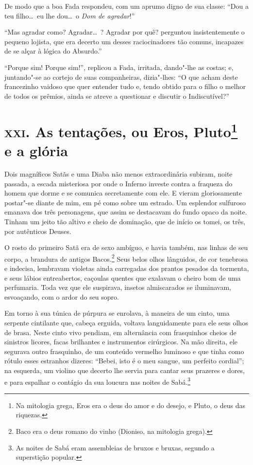 De modo que a boa Fada respondeu, com um aprumo digno de sua classe:
``Dou a teu filho\ldots\  eu lhe dou\ldots\  o \textit{Dom de
agradar}!''

``Mas agradar como? Agradar\ldots\ ? Agradar por quê? perguntou insistentemente 
o pequeno lojista, que era decerto um desses
raciocinadores tão comuns, incapazes de se alçar à lógica do
Absurdo.''

``Porque sim! Porque sim!'', replicou a Fada,
irritada, dando"-lhe as costas; e, juntando"-se ao cortejo de suas
companheiras, dizia"-lhes: ``O que acham deste
francezinho vaidoso que quer entender tudo e, tendo obtido para o filho o 
melhor de todos os prêmios, ainda se atreve a questionar e discutir o
Indiscutível?''

\chapter{\textsc{xxi.} As tentações, ou Eros, Pluto\footnote[*]{Na mitologia  grega, Eros era o deus do amor e do desejo, e Pluto, o deus das riquezas.} e a glória}

Dois magníficos Satãs e uma Diaba não menos extraordinária subiram,
noite passada, a escada misteriosa por onde o Inferno investe contra a
fraqueza do homem que dorme e se comunica secretamente com ele. E 
vieram gloriosamente postar"-se diante de mim, em pé como sobre um
estrado. Um esplendor sulfuroso emanava dos três personagens, que
assim se destacavam do fundo opaco da noite. Tinham um jeito tão altivo
e cheio de dominação, que de início os tomei, os três, por autênticos Deuses.

O rosto do primeiro Satã era de sexo ambíguo, e havia também, nas linhas
de seu corpo, a brandura de antigos Bacos.\footnote{ Baco era o deus 
romano do vinho (Dioniso, na mitologia grega).}
Seus belos olhos lânguidos, de cor tenebrosa e indecisa, lembravam
violetas ainda carregadas dos prantos pesados da tormenta, e seus
lábios entreabertos, caçoulas quentes que exalavam o cheiro
bom de uma perfumaria. Toda vez que ele suspirava, insetos
almiscarados se iluminavam, esvoaçando, com o ardor do seu sopro.

Em torno à sua túnica de púrpura se enrolava, à maneira de um cinto,
uma serpente cintilante que, cabeça erguida, voltava
languidamente para ele seus olhos de brasa. Neste cinto vivo pendiam, em alternância com frasquinhos cheios de sinistros licores,
facas brilhantes e instrumentos cirúrgicos. Na mão direita, ele segurava
outro frasquinho, de um conteúdo vermelho luminoso e que
tinha como rótulo esses estranhos dizeres: ``Bebei,
isto é o meu sangue, um perfeito
cordial''; na esquerda,
um violino que decerto lhe servia para cantar seus prazeres e
dores, e para espalhar o contágio da sua loucura nas noites de
Sabá.\footnote{ As noites de Sabá eram assembleias de bruxos e bruxas, segundo a
superstição popular.}


